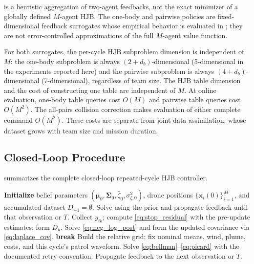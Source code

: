 \documentclass{article}
\newcommand{\bs}[1]{\boldsymbol{#1}}
\newcommand{\x}{\mathbf{x}}
\begin{document}
 is a heuristic aggregation of two-agent feedbacks, not the exact minimizer of a globally defined $M$-agent HJB.
The one-body and pairwise policies are fixed-dimensional feedback surrogates whose empirical behavior is evaluated in ; they are not error-controlled approximations of the full $M$-agent value function.

For both surrogates, the per-cycle HJB subproblem dimension is independent of $M$: the one-body subproblem is always $(2+d_b)$-dimensional (5-dimensional in the experiments reported here) and the pairwise subproblem is always $(4+d_b)$-dimensional (7-dimensional), regardless of team size.
The HJB table dimension and the cost of constructing one table are independent of $M$.
At online evaluation, one-body table queries cost $O(M)$ and pairwise table queries cost $O(M^2)$.
The all-pairs collision correction makes evaluation of either complete command $O(M^2)$.
These costs are separate from joint data assimilation, whose dataset grows with team size and mission duration.

\subsection{Closed-Loop Procedure}
\label{sec:closed_loop_procedure}

 summarizes the complete closed-loop repeated-cycle HJB controller.
\begin{algorithm}[t]
\caption{Closed-loop repeated-cycle HJB controller}
\label{alg:closed_loop}
\begin{algorithmic}[1]
\State \textbf{Initialize} belief parameters $(\bs\mu_0,\bs\Sigma_0,\hat\zeta_0,\sigma_{\zeta,0}^2)$, drone positions $\{\x_i(0)\}_{i=1}^M$, and accumulated dataset $D_{-1}=\emptyset$.
    \State Solve using the prior and propagate feedback until that observation or $T$.
\EndIf
{}
    \State Collect $y_{ik}$; compute \eqref{eq:stop_residual} with the pre-update estimates; form $D_k$.
    \State Solve \eqref{eq:neg_log_post} and form the updated covariance via \eqref{eq:laplace_cov}.
        \State \textbf{break}
    \EndIf
    \State Build the relative grid; fix nominal means, wind, plume, costs, and this cycle's patrol waveform.
    \State Solve \eqref{eq:bellman}--\eqref{eq:picard} with the documented retry convention.
    \State Propagate feedback to the next observation or $T$.
\EndFor

\end{algorithmic}
\end{algorithm}
\end{document}

